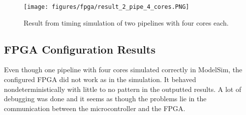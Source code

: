 \begin{figure}[H]
    \centering
    \texttt{[image: figures/fpga/result\_2\_pipe\_4\_cores.PNG]}
    \caption{Result from timing simulation of two pipelines with four cores each.}
    \label{fig:two_pipe_four_core}
\end{figure}


\subsection{FPGA Configuration Results}
Even though one pipeline with four cores simulated correctly in ModelSim, the configured FPGA 
did not work as in the simulation. It behaved nondeterministically with little to no pattern
in the outputted results. A lot of debugging was done and it seems as though the problems
lie in the communication between the microcontroller and the FPGA. 

